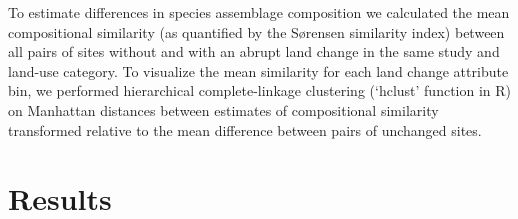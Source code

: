 To estimate differences in species assemblage composition we calculated the mean compositional similarity (as quantified by the Sørensen similarity index) between all pairs of sites without and with an abrupt land change in the same study and land-use category. To visualize the mean similarity for each land change attribute bin, we performed hierarchical complete-linkage clustering (‘hclust’ function in R) on Manhattan distances between estimates of compositional similarity transformed relative to the mean difference between pairs of unchanged sites.

\section{Results}

\clearpage
%

%  
